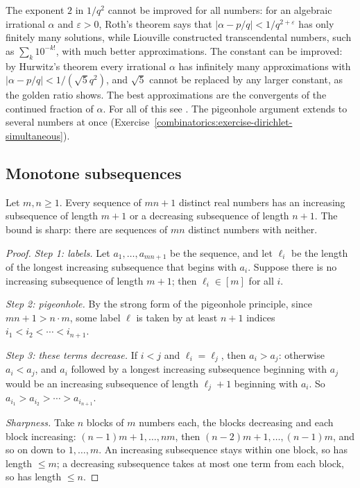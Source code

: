 \begin{remark}\label{combinatorics:remark-hurwitz}
The exponent $2$ in $1/q^2$ cannot be improved for all numbers: for an algebraic irrational $\alpha$ and $\varepsilon > 0$, Roth's theorem says that $|\alpha - p/q| < 1/q^{2+\varepsilon}$ has only
finitely many solutions, while Liouville constructed transcendental numbers, such as $\sum_k10^{-k!}$, with much better approximations. The constant can be improved: by Hurwitz's theorem every irrational
$\alpha$ has infinitely many approximations with $|\alpha - p/q| < 1/(\sqrt{5}q^2)$, and $\sqrt5$ cannot be replaced by any larger constant, as the golden ratio shows. The best approximations are the
convergents of the continued fraction of $\alpha$. For all of this see \cite[Chapters X and XI]{hardy-wright}. The pigeonhole argument extends to several numbers at once
(Exercise~\ref{combinatorics:exercise-dirichlet-simultaneous}).
\end{remark}

\subsection{Monotone subsequences}\label{combinatorics:subsection-erdos-szekeres}

\begin{theorem}\label{combinatorics:theorem-erdos-szekeres}
Let $m, n \geq 1$. Every sequence of $mn + 1$ distinct real numbers has an increasing subsequence of length $m + 1$ or a decreasing subsequence of length $n + 1$. The bound is sharp: there are sequences
of $mn$ distinct numbers with neither.
\end{theorem}

\begin{proof}
\emph{Step 1: labels.} Let $a_1, \ldots, a_{mn+1}$ be the sequence, and let $\ell_i$ be the length of the longest increasing subsequence that begins with $a_i$. Suppose there is no increasing
subsequence of length $m + 1$; then $\ell_i \in [m]$ for all $i$.

\emph{Step 2: pigeonhole.} By the strong form of the pigeonhole principle, since $mn + 1 > n \cdot m$, some label $\ell$ is taken by at least $n + 1$ indices $i_1 < i_2 < \cdots < i_{n+1}$.

\emph{Step 3: these terms decrease.} If $i < j$ and $\ell_i = \ell_j$, then $a_i > a_j$: otherwise $a_i < a_j$, and $a_i$ followed by a longest increasing subsequence beginning with $a_j$ would be an
increasing subsequence of length $\ell_j + 1$ beginning with $a_i$. So $a_{i_1} > a_{i_2} > \cdots > a_{i_{n+1}}$.

\emph{Sharpness.} Take $n$ blocks of $m$ numbers each, the blocks decreasing and each block increasing: $(n - 1)m + 1, \ldots, nm$, then $(n - 2)m + 1, \ldots, (n - 1)m$, and so on down to
$1, \ldots, m$. An increasing subsequence stays within one block, so has length $\leq m$; a decreasing subsequence takes at most one term from each block, so has length $\leq n$.
\end{proof}

